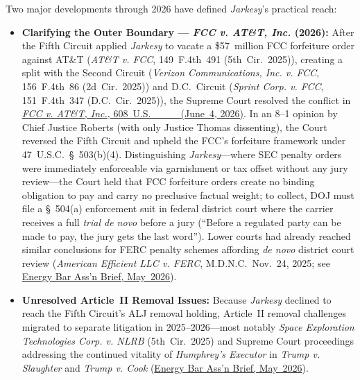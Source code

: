 \documentclass[12pt]{article}
\begin{document}
Two major developments through 2026 have defined \textit{Jarkesy}'s practical reach:
\begin{itemize}
  \item \textbf{Clarifying the Outer Boundary --- \textit{FCC v. AT\&T, Inc.} (2026):} After the Fifth Circuit applied \textit{Jarkesy} to vacate a \$57~million FCC forfeiture order against AT\&T (\textit{AT\&T v. FCC}, 149~F.4th~491 (5th~Cir.~2025)), creating a split with the Second Circuit (\textit{Verizon Communications, Inc. v. FCC}, 156~F.4th~86 (2d~Cir.~2025)) and D.C.~Circuit (\textit{Sprint Corp. v. FCC}, 151~F.4th~347 (D.C.~Cir.~2025)), the Supreme Court resolved the conflict in \href{https://supreme.justia.com/cases/federal/us/608/25-406/}{\textit{FCC v. AT\&T, Inc.}, 608~U.S.~\_\_\_ (June~4, 2026)}. In an 8--1 opinion by Chief Justice Roberts (with only Justice Thomas dissenting), the Court reversed the Fifth Circuit and upheld the FCC's forfeiture framework under 47~U.S.C.~\S~503(b)(4). Distinguishing \textit{Jarkesy}---where SEC penalty orders were immediately enforceable via garnishment or tax offset without any jury review---the Court held that FCC forfeiture orders create no binding obligation to pay and carry no preclusive factual weight; to collect, DOJ must file a \S~504(a) enforcement suit in federal district court where the carrier receives a full \textit{trial de novo} before a jury (``Before a regulated party can be made to pay, the jury gets the last word''). Lower courts had already reached similar conclusions for FERC penalty schemes affording \textit{de novo} district court review (\textit{American Efficient LLC v. FERC}, M.D.N.C.~Nov.~24, 2025; see \href{https://www.eba-net.org/wp-content/uploads/2026/05/EBA-Brief-2026-Vol-7.1.pdf}{Energy Bar Ass'n Brief, May~2026}).
  \item \textbf{Unresolved Article~II Removal Issues:} Because \textit{Jarkesy} declined to reach the Fifth Circuit's ALJ removal holding, Article~II removal challenges migrated to separate litigation in 2025--2026---most notably \textit{Space Exploration Technologies Corp. v. NLRB} (5th~Cir.~2025) and Supreme Court proceedings addressing the continued vitality of \textit{Humphrey's Executor} in \textit{Trump v. Slaughter} and \textit{Trump v. Cook} (\href{https://www.eba-net.org/wp-content/uploads/2026/05/EBA-Brief-2026-Vol-7.1.pdf}{Energy Bar Ass'n Brief, May~2026}).
\end{itemize}
\end{document}
